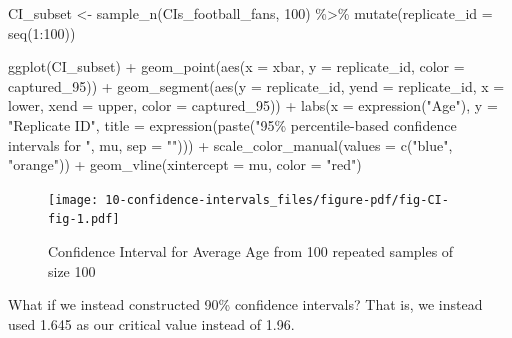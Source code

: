 \documentclass[
  letterpaper,
  DIV=11,
  numbers=noendperiod]{scrreprt}
\newenvironment{Shaded}{\begin{snugshade}}{\end{snugshade}}
\newcommand{\AttributeTok}[1]{\textcolor[rgb]{0.40,0.45,0.13}{#1}}
\newcommand{\DecValTok}[1]{\textcolor[rgb]{0.68,0.00,0.00}{#1}}
\newcommand{\FunctionTok}[1]{\textcolor[rgb]{0.28,0.35,0.67}{#1}}
\newcommand{\NormalTok}[1]{\textcolor[rgb]{0.00,0.23,0.31}{#1}}
\newcommand{\OtherTok}[1]{\textcolor[rgb]{0.00,0.23,0.31}{#1}}
\newcommand{\SpecialCharTok}[1]{\textcolor[rgb]{0.37,0.37,0.37}{#1}}
\newcommand{\StringTok}[1]{\textcolor[rgb]{0.13,0.47,0.30}{#1}}
\theoremstyle{definition}
\theoremstyle{remark}
\begin{document}
\begin{Shaded}
\begin{Highlighting}[]
\NormalTok{CI\_subset }\OtherTok{\textless{}{-}} \FunctionTok{sample\_n}\NormalTok{(CIs\_football\_fans, }\DecValTok{100}\NormalTok{) }\SpecialCharTok{\%\textgreater{}\%} 
  \FunctionTok{mutate}\NormalTok{(}\AttributeTok{replicate\_id =} \FunctionTok{seq}\NormalTok{(}\DecValTok{1}\SpecialCharTok{:}\DecValTok{100}\NormalTok{))}

\FunctionTok{ggplot}\NormalTok{(CI\_subset) }\SpecialCharTok{+}
  \FunctionTok{geom\_point}\NormalTok{(}\FunctionTok{aes}\NormalTok{(}\AttributeTok{x =}\NormalTok{ xbar, }\AttributeTok{y =}\NormalTok{ replicate\_id, }\AttributeTok{color =}\NormalTok{ captured\_95)) }\SpecialCharTok{+}
  \FunctionTok{geom\_segment}\NormalTok{(}\FunctionTok{aes}\NormalTok{(}\AttributeTok{y =}\NormalTok{ replicate\_id, }\AttributeTok{yend =}\NormalTok{ replicate\_id, }\AttributeTok{x =}\NormalTok{ lower, }\AttributeTok{xend =}\NormalTok{ upper, }
                   \AttributeTok{color =}\NormalTok{ captured\_95)) }\SpecialCharTok{+}
  \FunctionTok{labs}\NormalTok{(}\AttributeTok{x =} \FunctionTok{expression}\NormalTok{(}\StringTok{"Age"}\NormalTok{),}
       \AttributeTok{y =} \StringTok{"Replicate ID"}\NormalTok{,}
       \AttributeTok{title =} \FunctionTok{expression}\NormalTok{(}\FunctionTok{paste}\NormalTok{(}\StringTok{"95\% percentile{-}based confidence intervals for "}\NormalTok{, }
\NormalTok{                             mu, }\AttributeTok{sep =} \StringTok{""}\NormalTok{))) }\SpecialCharTok{+}
  \FunctionTok{scale\_color\_manual}\NormalTok{(}\AttributeTok{values =} \FunctionTok{c}\NormalTok{(}\StringTok{"blue"}\NormalTok{, }\StringTok{"orange"}\NormalTok{)) }\SpecialCharTok{+} 
  \FunctionTok{geom\_vline}\NormalTok{(}\AttributeTok{xintercept =}\NormalTok{ mu, }\AttributeTok{color =} \StringTok{"red"}\NormalTok{) }
\end{Highlighting}
\end{Shaded}

\begin{figure}[H]

{\centering \texttt{[image: 10-confidence-intervals\_files/figure-pdf/fig-CI-fig-1.pdf]}

}

\caption{\label{fig-CI-fig}Confidence Interval for Average Age from 100
repeated samples of size 100}

\end{figure}

What if we instead constructed 90\% confidence intervals? That is, we
instead used 1.645 as our critical value instead of 1.96.
\end{document}
